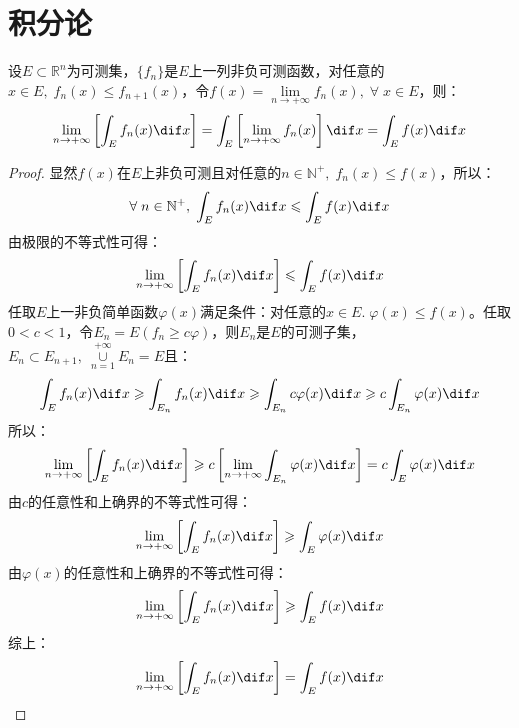\section{积分论}
\begin{theorem}
	设$E\subset\mathbb{R}^{n}$为可测集，$\{f_n\}$是$E$上一列非负可测函数，对任意的$x\in E,\;f_n(x)\leqslant f_{n+1}(x)$，令$f(x)=\lim\limits_{n\to+\infty}f_n(x),\;\forall\;x\in E$，则：
	\begin{equation*}
		\lim_{n\to+\infty}\left[\int_{E}f_n(x)\dif x\right]=\int_{E}\left[\lim_{n\to+\infty}f_n(x)\right]\dif x=\int_{E}f(x)\dif x
	\end{equation*}
\end{theorem}
\begin{proof}
	显然$f(x)$在$E$上非负可测且对任意的$n\in\mathbb{N}^+,\;f_n(x)\leqslant f(x)$，所以：
	\begin{equation*}
		\forall\;n\in\mathbb{N}^+,\;\int_{E}f_n(x)\dif x\leqslant\int_{E}f(x)\dif x
	\end{equation*}
	由极限的不等式性可得：
	\begin{equation*}
		\lim_{n\to+\infty}\left[\int_{E}f_n(x)\dif x\right]\leqslant\int_{E}f(x)\dif x
	\end{equation*}
	任取$E$上一非负简单函数$\varphi(x)$满足条件：对任意的$x\in E.\;\varphi(x)\leqslant f(x)$。任取$0<c<1$，令$E_n=E(f_n\geqslant c\varphi)$，则$E_n$是$E$的可测子集，$E_n\subset E_{n+1},\;\underset{n=1}{\overset{+\infty}{\cup}}E_n=E$且：
	\begin{equation*}
		\int_{E}f_n(x)\dif x\geqslant\int_{E_n}f_n(x)\dif x\geqslant\int_{E_n}c\varphi(x)\dif x\geqslant c\int_{E_n}\varphi(x)\dif x
	\end{equation*}
	所以：
	\begin{equation*}
		\lim_{n\to+\infty}\left[\int_{E}f_n(x)\dif x\right]\geqslant c\left[\lim_{n\to+\infty}\int_{E_n}\varphi(x)\dif x\right]=c\int_{E}\varphi(x)\dif x
	\end{equation*}
	由$c$的任意性和上确界的不等式性可得：
	\begin{equation*}
		\lim_{n\to+\infty}\left[\int_{E}f_n(x)\dif x\right]\geqslant\int_{E}\varphi(x)\dif x
	\end{equation*}
	由$\varphi(x)$的任意性和上确界的不等式性可得：
	\begin{equation*}
		\lim_{n\to+\infty}\left[\int_{E}f_n(x)\dif x\right]\geqslant\int_{E}f(x)\dif x
	\end{equation*}
	综上：
	\begin{equation*}
		\lim_{n\to+\infty}\left[\int_{E}f_n(x)\dif x\right]=\int_{E}f(x)\dif x\qedhere
	\end{equation*}
\end{proof}

